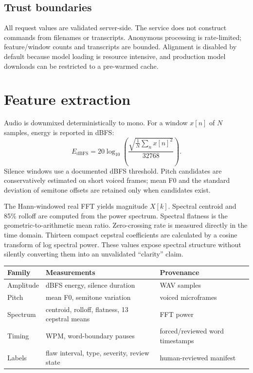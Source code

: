 \documentclass[10pt]{article}
\begin{document}
\subsection{Trust boundaries}
All request values are validated server-side. The service does not construct commands from filenames or transcripts. Anonymous processing is rate-limited; feature/window counts and transcripts are bounded. Alignment is disabled by default because model loading is resource intensive, and production model downloads can be restricted to a pre-warmed cache.

\newpage
\section{Feature extraction}
Audio is downmixed deterministically to mono. For a window $x[n]$ of $N$ samples, energy is reported in dBFS:
\[
E_{\mathrm{dBFS}}=20\log_{10}\left(\frac{\sqrt{\frac{1}{N}\sum_n x[n]^2}}{32768}\right).
\]
Silence windows use a documented dBFS threshold. Pitch candidates are conservatively estimated on short voiced frames; mean F0 and the standard deviation of semitone offsets are retained only when candidates exist.

The Hann-windowed real FFT yields magnitude $X[k]$. Spectral centroid and 85\% rolloff are computed from the power spectrum. Spectral flatness is the geometric-to-arithmetic mean ratio. Zero-crossing rate is measured directly in the time domain. Thirteen compact cepstral coefficients are calculated by a cosine transform of log spectral power. These values expose spectral structure without silently converting them into an unvalidated ``clarity'' claim.

\begin{table}[h]
\centering
\begin{tabularx}{\textwidth}{lXl}
\toprule
Family & Measurements & Provenance \\
\midrule
Amplitude & dBFS energy, silence duration & WAV samples \\
Pitch & mean F0, semitone variation & voiced microframes \\
Spectrum & centroid, rolloff, flatness, 13 cepstral means & FFT power \\
Timing & WPM, word-boundary pauses & forced/reviewed word timestamps \\
Labels & flaw interval, type, severity, review state & human-reviewed manifest \\
\bottomrule
\end{tabularx}
\end{table}
\end{document}
